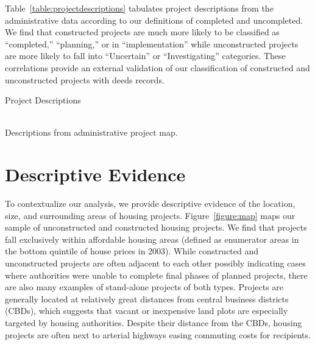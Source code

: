 \documentclass[12pt]{article}
\begin{document}
Table~\ref{table:projectdescriptions} tabulates project descriptions from the administrative data according to our definitions of completed and uncompleted.  We find that constructed projects are much more likely to be classified as ``completed,'' ``planning,'' or in ``implementation'' while unconstructed projects are more likely to fall into ``Uncertain'' or ``Investigating'' categories.  These correlations provide an external validation of our classification of constructed and unconstructed projects with deeds records.
\begin{table}
\centering
\caption{Project Descriptions}\label{table:projectdescriptions}
\\
\vspace{.2cm}
\footnotesize{Descriptions from administrative project map.}
\end{table}


\section{Descriptive Evidence}\label{section:descriptives}



To contextualize our analysis, we provide descriptive evidence of the location, size, and surrounding areas of housing projects.  Figure~\ref{figure:map} maps our sample of unconstructed and constructed housing projects.  We find that projects fall exclusively within affordable housing areas (defined as enumerator areas in the bottom quintile of house prices in 2003).  While constructed and unconstructed projects are often adjacent to each other possibly indicating cases where authorities were unable to complete final phases of planned projects, there are also many examples of stand-alone projects of both types.  Projects are generally located at relatively great distances from central business districts (CBDs), which suggests that vacant or inexpensive land plots are especially targeted by housing authorities.  Despite their distance from the CBDs, housing projects are often next to arterial highways easing commuting costs for recipients.
\end{document}
